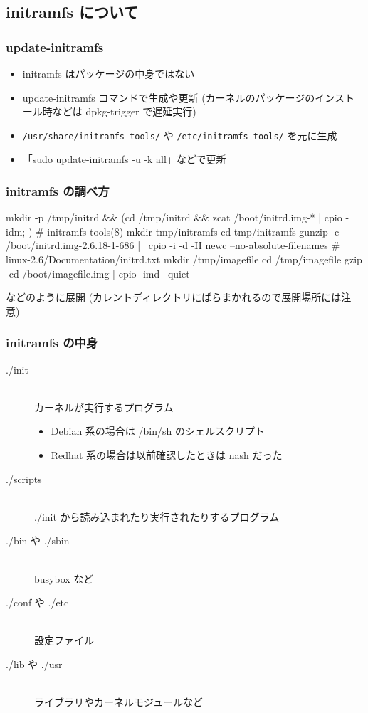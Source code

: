 \documentclass[mingoth,a4paper]{jsarticle}
\begin{document}
\subsection{initramfs について}

\subsubsection{update-initramfs}

\begin{itemize}
\item initramfs はパッケージの中身ではない
\item update-initramfs コマンドで生成や更新
    (カーネルのパッケージのインストール時などは dpkg-trigger で遅延実行)
\item \texttt{/usr/share/initramfs-tools/} や \texttt{/etc/initramfs-tools/} を元に生成
\item 「sudo update-initramfs -u -k all」などで更新
\end{itemize}
\subsubsection{initramfs の調べ方}
\begin{commandline}
 mkdir -p /tmp/initrd && (cd /tmp/initrd && { zcat /boot/initrd.img-* | cpio -idm; })
 # initramfs-tools(8)
 mkdir tmp/initramfs
 cd tmp/initramfs
 gunzip -c /boot/initrd.img-2.6.18-1-686 | \
 cpio -i -d -H newc --no-absolute-filenames
 # linux-2.6/Documentation/initrd.txt
 mkdir /tmp/imagefile
 cd /tmp/imagefile
 gzip -cd /boot/imagefile.img | cpio -imd --quiet
\end{commandline}

などのように展開
(カレントディレクトリにばらまかれるので展開場所には注意)

\subsubsection{initramfs の中身}

\begin{description}
\item [./init] 　\\
カーネルが実行するプログラム
\begin{itemize}
      \item Debian 系の場合は /bin/sh のシェルスクリプト
      \item Redhat 系の場合は以前確認したときは nash だった
\end{itemize}
\item [./scripts]　\\ ./init から読み込まれたり実行されたりするプログラム
\item [./bin や ./sbin]　\\ busybox など
\item [./conf や ./etc]　\\ 設定ファイル
\item [./lib や ./usr]　\\ ライブラリやカーネルモジュールなど
\end{description}
\end{document}
